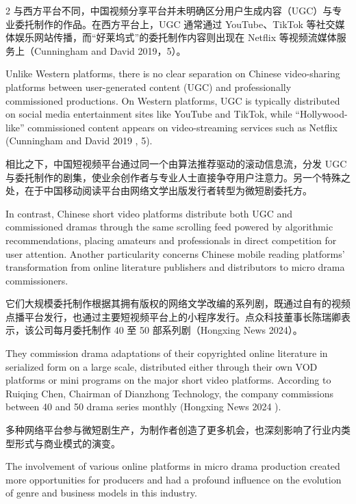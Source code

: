 \documentclass[10pt,a4paper]{article}
\begin{document}
\begin{paracol}{2}
\switchcolumn*
与西方平台不同，中国视频分享平台并未明确区分用户生成内容（UGC）与专业委托制作的作品。在西方平台上，UGC 通常通过 YouTube、TikTok 等社交媒体娱乐网站传播，而“好莱坞式”的委托制作内容则出现在 Netflix 等视频流媒体服务上（Cunningham and David 2019，5）。\par
\switchcolumn
Unlike Western platforms, there is no clear separation on Chinese video-sharing platforms between user-generated content (UGC) and professionally commissioned productions. On Western platforms, UGC is typically distributed on social media entertainment sites like YouTube and TikTok, while “Hollywood-like” commissioned content appears on video-streaming services such as Netflix (Cunningham and David 2019 , 5).\par
\switchcolumn*
相比之下，中国短视频平台通过同一个由算法推荐驱动的滚动信息流，分发 UGC 与委托制作的剧集，使业余创作者与专业人士直接争夺用户注意力。另一个特殊之处，在于中国移动阅读平台由网络文学出版发行者转型为微短剧委托方。\par
\switchcolumn
In contrast, Chinese short video platforms distribute both UGC and commissioned dramas through the same scrolling feed powered by algorithmic recommendations, placing amateurs and professionals in direct competition for user attention. Another particularity concerns Chinese mobile reading platforms’ transformation from online literature publishers and distributors to micro drama commissioners.\par
\switchcolumn*
它们大规模委托制作根据其拥有版权的网络文学改编的系列剧，既通过自有的视频点播平台发行，也通过主要短视频平台上的小程序发行。点众科技董事长陈瑞卿表示，该公司每月委托制作 40 至 50 部系列剧（Hongxing News 2024）。\par
\switchcolumn
They commission drama adaptations of their copyrighted online literature in serialized form on a large scale, distributed either through their own VOD platforms or mini programs on the major short video platforms. According to Ruiqing Chen, Chairman of Dianzhong Technology, the company commissions between 40 and 50 drama series monthly (Hongxing News 2024 ).\par
\switchcolumn*
多种网络平台参与微短剧生产，为制作者创造了更多机会，也深刻影响了行业内类型形式与商业模式的演变。\par
\switchcolumn
The involvement of various online platforms in micro drama production created more opportunities for producers and had a profound influence on the evolution of genre and business models in this industry.\par

\end{paracol}
\end{document}
